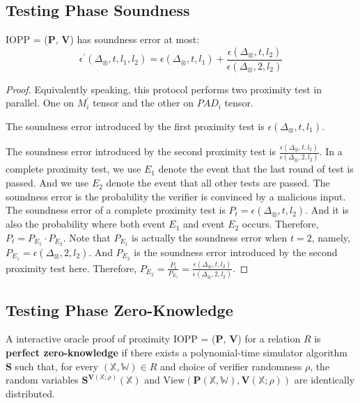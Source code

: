 \subsection{Testing Phase Soundness}

\begin{lemma}
\label{lemma:szkpctc-soundness}


IOPP = ($\textbf{P}$, $\textbf{V}$) has soundness error at most:
$$
    \epsilon^\prime(\Delta_\otimes, t, l_1, l_2) = \epsilon(\Delta_\otimes, t, l_1) + \frac{\epsilon(\Delta_\otimes, t, l_2)}{\epsilon(\Delta_\otimes, 2, l_2)}
$$

\end{lemma}
\begin{proof}

Equivalently speaking, this protocol performs two proximity test in parallel. One on $M_i^\prime$ tensor and the other on $PAD_i$ tensor. 

The soundness error introduced by the first proximity test is $\epsilon(\Delta_\otimes, t, l_1)$. 

The soundness error introduced by the second proximity test is $\frac{\epsilon(\Delta_\otimes, t, l_2)}{\epsilon(\Delta_\otimes, 2, l_2)}$. 
In a complete proximity test, we use $E_1$ denote the event that the last round of test is passed. And we use $E_2$ denote the event that all other tests are passed.
The soundness error is the probability the verifier is convinced by a malicious input.
The soundness error of a complete proximity test is $P_t = \epsilon(\Delta_\otimes, t, l_2)$. And it is also the probability where both event $E_1$ and event $E_2$ occurs. Therefore, $P_t = P_{E_1} \cdot P_{E_2}$. Note that $P_{E_1}$ is actually the soundness error when $t=2$, namely, $P_{E_1} = \epsilon(\Delta_\otimes, 2, l_2)$. And $P_{E_2}$ is the soundness error introduced by the second proximity test here. Therefore, $P_{E_2} = \frac{P_{t}}{P_{E_1}} = \frac{\epsilon(\Delta_\otimes, t, l_2)}{\epsilon(\Delta_\otimes, 2, l_2)}$.

\end{proof}


\subsection{Testing Phase Zero-Knowledge}

\begin{definition}

A interactive oracle proof of proximity IOPP = ($\textbf{P}$, $\textbf{V}$) for a relation $R$ is \textbf{perfect zero-knowledge} if there exists a polynomial-time simulator algorithm $\textbf{S}$ such that, for every $(\mathbb{X}, \mathbb{W}) \in R$ and choice of verifier randomness $\rho$, the random variables $\textbf{S}^{\textbf{V}(\mathbb{X};\rho)}(\mathbb{X})$ and $\text{View}(\textbf{P}(\mathbb{X}, \mathbb{W}), \textbf{V}(\mathbb{X};\rho))$ are identically distributed.
 
\end{definition}

